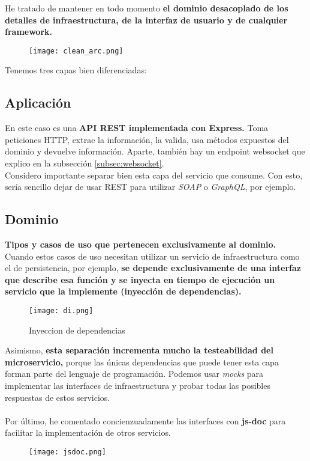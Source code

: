 He tratado de mantener en todo momento \textbf{el dominio desacoplado de los detalles de infraestructura, de la interfaz de usuario y de cualquier framework.}
\begin{figure}[H]
	\centering	
	\texttt{[image: clean\_arc.png]}
	\end{figure}

Tenemos tres capas bien diferenciadas:
\subsection{Aplicación}
En este caso es una \textbf{API REST implementada con Express.} Toma peticiones HTTP, extrae la información, la valida, usa métodos expuestos del dominio y devuelve información.
Aparte, también hay un endpoint websocket que explico en la subsección \ref{subsec:websocket}. \\
Considero importante separar bien esta capa del servicio que consume. Con esto, sería sencillo dejar de usar 
REST para utilizar \textit{SOAP} o \textit{GraphQL}, por ejemplo.

\subsection{Dominio}
\textbf{Tipos y casos de uso que pertenecen exclusivamente al dominio.}
Cuando estos casos de uso necesitan utilizar un servicio de infraestructura como el de persistencia, por ejemplo,
\textbf{se depende exclusivamente de una interfaz que describe esa función y se inyecta en tiempo de ejecución un servicio que la implemente (inyección de dependencias).}
\begin{figure}[H]
	\centering	
	\texttt{[image: di.png]}
	\caption{Inyeccion de dependencias}
	\end{figure}

Asimismo, \textbf{esta separación incrementa mucho la testeabilidad del microservicio,} porque las únicas dependencias
que puede tener esta capa forman parte del lenguaje de programación. Podemos usar \textit{mocks} para implementar
las interfaces de infraestructura y probar todas las posibles respuestas de estos servicios. \\ \\
Por último, he comentado concienzuadamente las interfaces con \textbf{js-doc} para facilitar la implementación de otros servicios.
\begin{figure}[H]
	\centering	
	\texttt{[image: jsdoc.png]}
	\end{figure}

